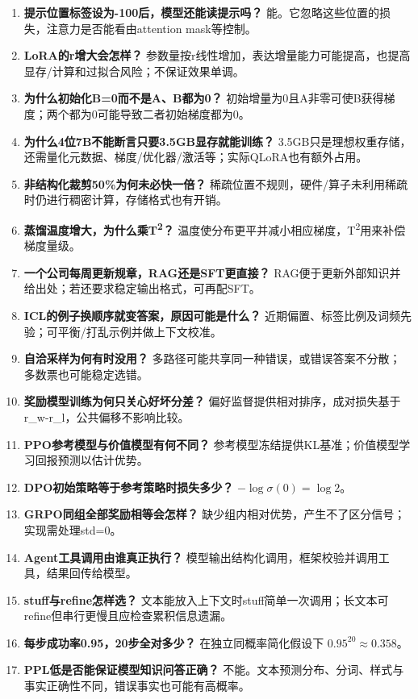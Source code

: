 \documentclass[UTF8,a4paper,zihao=-4,fontset=windows]{ctexart}
\begin{document}
\begin{enumerate}
\item {}\textbf{提示位置标签设为-100后，模型还能读提示吗？} 能。它忽略这些位置的损失，注意力是否能看由attention mask等控制。
\item {}\textbf{LoRA的r增大会怎样？} 参数量按r线性增加，表达增量能力可能提高，也提高显存/\allowbreak{}计算和过拟合风险；不保证效果单调。
\item {}\textbf{为什么初始化B=0而不是A、B都为0？} 初始增量为0且A非零可使B获得梯度；两个都为0可能导致二者初始梯度都为0。
\item {}\textbf{为什么4位7B不能断言只要3.5GB显存就能训练？} 3.5GB只是理想权重存储，还需量化元数据、梯度/\allowbreak{}优化器/\allowbreak{}激活等；实际QLoRA也有额外占用。
\item {}\textbf{非结构化裁剪50\%为何未必快一倍？} 稀疏位置不规则，硬件/\allowbreak{}算子未利用稀疏时仍进行稠密计算，存储格式也有开销。
\item {}\textbf{蒸馏温度增大，为什么乘T\textsuperscript{2}？} 温度使分布更平并减小相应梯度，T\textsuperscript{2}用来补偿梯度量级。
\item {}\textbf{一个公司每周更新规章，RAG还是SFT更直接？} RAG便于更新外部知识并给出处；若还要求稳定输出格式，可再配SFT。
\item {}\textbf{ICL的例子换顺序就变答案，原因可能是什么？} 近期偏置、标签比例及词频先验；可平衡/\allowbreak{}打乱示例并做上下文校准。
\item {}\textbf{自洽采样为何有时没用？} 多路径可能共享同一种错误，或错误答案不分散；多数票也可能稳定选错。
\item {}\textbf{奖励模型训练为何只关心好坏分差？} 偏好监督提供相对排序，成对损失基于r\_w-r\_l，公共偏移不影响比较。
\item {}\textbf{PPO参考模型与价值模型有何不同？} 参考模型冻结提供KL基准；价值模型学习回报预测以估计优势。
\item {}\textbf{DPO初始策略等于参考策略时损失多少？} $-\log\sigma(0)=\log2$。
\item {}\textbf{GRPO同组全部奖励相等会怎样？} 缺少组内相对优势，产生不了区分信号；实现需处理std=0。
\item {}\textbf{Agent工具调用由谁真正执行？} 模型输出结构化调用，框架校验并调用工具，结果回传给模型。
\item {}\textbf{stuff与refine怎样选？} 文本能放入上下文时stuff简单一次调用；长文本可refine但串行更慢且应检查累积信息遗漏。
\item {}\textbf{每步成功率0.95，20步全对多少？} 在独立同概率简化假设下 $0.95^{20}\approx0.358$。
\item {}\textbf{PPL低是否能保证模型知识问答正确？} 不能。文本预测分布、分词、样式与事实正确性不同，错误事实也可能有高概率。

\end{enumerate}
\end{document}
